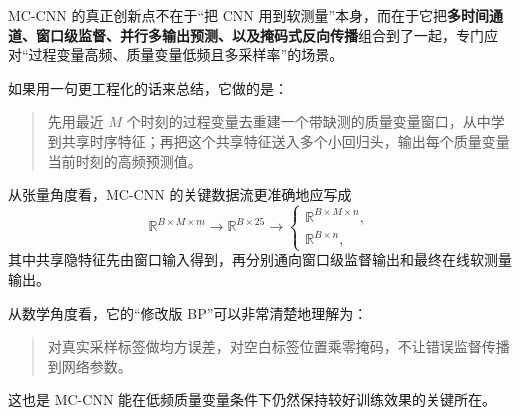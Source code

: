 \documentclass[UTF8]{ctexart}
\begin{document}
MC-CNN 的真正创新点不在于“把 CNN 用到软测量”本身，而在于它把\textbf{多时间通道、窗口级监督、并行多输出预测、以及掩码式反向传播}组合到了一起，专门应对“过程变量高频、质量变量低频且多采样率”的场景。

如果用一句更工程化的话来总结，它做的是：
\begin{quote}
先用最近 $M$ 个时刻的过程变量去重建一个带缺测的质量变量窗口，从中学到共享时序特征；再把这个共享特征送入多个小回归头，输出每个质量变量当前时刻的高频预测值。
\end{quote}

从张量角度看，MC-CNN 的关键数据流更准确地应写成
\begin{equation}
    \mathbb{R}^{B \times M \times m}
    \to
    \mathbb{R}^{B \times 25}
    \to
    \begin{cases}
        \mathbb{R}^{B \times M \times n}, \\
        \mathbb{R}^{B \times n},
    \end{cases}
\end{equation}
其中共享隐特征先由窗口输入得到，再分别通向窗口级监督输出和最终在线软测量输出。

从数学角度看，它的“修改版 BP”可以非常清楚地理解为：
\begin{quote}
对真实采样标签做均方误差，对空白标签位置乘零掩码，不让错误监督传播到网络参数。
\end{quote}

这也是 MC-CNN 能在低频质量变量条件下仍然保持较好训练效果的关键所在。
\end{document}
